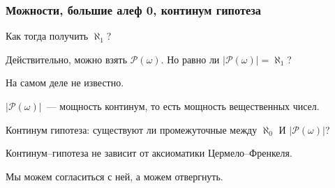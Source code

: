 \subsubsection{Можности, большие алеф 0, континум гипотеза}
Как тогда получить $\aleph_1$?

Действительно, можно взять $\mathcal{P} (\omega)$. Но равно ли $\left| \mathcal P (\omega) \right| = \aleph_1$?

На самом деле не известно.

\begin{definition}
    $\left| \mathcal{P}(\omega) \right|$~--- мощность континум, то есть мощность вещественных чисел.
\end{definition}

\begin{statement}
    Континум гипотеза: существуют ли промежуточные между $\aleph_0$ И $\left| \mathcal{P}(\omega) \right|$?
\end{statement}

\begin{theorem}
    [Коэн, 1962--1963]
    Континум--гипотеза не зависит от аксиоматики Цермело--Френкеля.

    Мы можем согласиться с ней, а можем отвергнуть.
\end{theorem}

